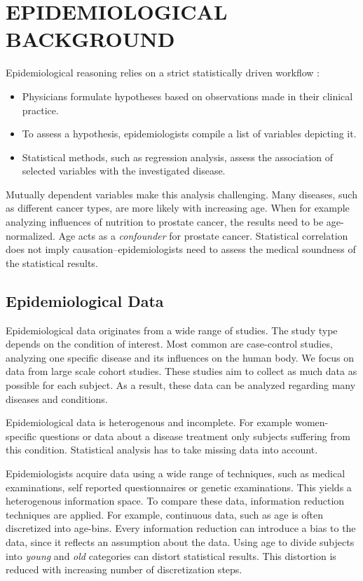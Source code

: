 \documentclass[a4paper,twoside]{style/article}
\begin{document}
\section{\uppercase{Epidemiological Background}}
\label{sec:EpidemiologicalBackground}
\noindent Epidemiological reasoning relies on a strict statistically driven workflow \cite{Fletcher}:
\begin{itemize}
	\item Physicians formulate hypotheses based on observations made in their clinical practice.
	\item To assess a hypothesis, epidemiologists compile a list of variables depicting it.
	\item Statistical methods, such as regression analysis, assess the association of selected variables with the investigated disease.
\end{itemize}
Mutually dependent variables make this analysis challenging.
Many diseases, such as different cancer types, are more likely with increasing age.
When for example analyzing influences of nutrition to prostate cancer, the results need to be age-normalized.
Age acts as a \emph{confounder} for prostate cancer.
Statistical correlation does not imply causation--epidemiologists need to assess the medical soundness of the statistical results.
\subsection{Epidemiological Data}
Epidemiological data originates from a wide range of studies.
The study type depends on the condition of interest.
Most common are case-control studies, analyzing one specific disease and its influences on the human body.
We focus on data from large scale cohort studies.
These studies aim to collect as much data as possible for each subject.
As a result, these data can be analyzed regarding many diseases and conditions.

Epidemiological data is heterogenous and incomplete.
For example women-specific questions or data about a disease treatment only subjects suffering from this condition.
Statistical analysis has to take missing data into account.

Epidemiologists acquire data using a wide range of techniques, such as medical examinations, self reported questionnaires or genetic examinations.
This yields a heterogenous information space.
To compare these data, information reduction techniques are applied.
For example, continuous data, such as age is often discretized into age-bins.
Every information reduction can introduce a bias to the data, since it reflects an assumption about the data.
Using age to divide subjects into \emph{young} and \emph{old} categories can distort statistical results.
This distortion is reduced with increasing number of discretization steps.
\end{document}
